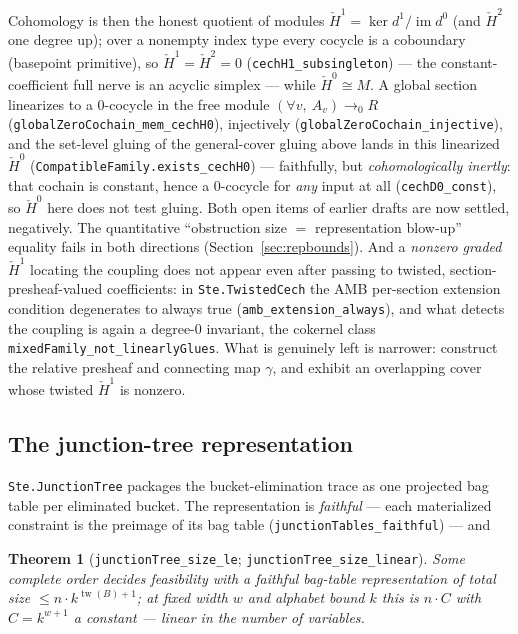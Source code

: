 \documentclass[11pt]{article}
\newtheorem{theorem}{Theorem}
\newcommand{\lean}[1]{\texttt{#1}}
\begin{document}
\noindent Cohomology is then the honest quotient of modules
$\check{H}^1 = \ker d^1 / \operatorname{im} d^0$ (and $\check{H}^2$ one
degree up); over a nonempty index type every cocycle is a coboundary
(basepoint primitive), so $\check{H}^1 = \check{H}^2 = 0$
(\lean{cechH1\_subsingleton}) --- the constant-coefficient full nerve is
an acyclic simplex --- while $\check{H}^0 \cong M$.  A global section
linearizes to a $0$-cocycle in the free module $(\forall v,\ A_v) \to_0
R$ (\lean{globalZeroCochain\_mem\_cechH0}), injectively
(\lean{globalZeroCochain\_injective}), and the set-level gluing of
the general-cover gluing above lands in this linearized $\check{H}^0$
(\lean{CompatibleFamily.exists\_cechH0}) --- faithfully, but
\emph{cohomologically inertly}: that cochain is constant, hence a
$0$-cocycle for \emph{any} input at all (\lean{cechD0\_const}), so
$\check{H}^0$ here does not test gluing.  Both open items of earlier
drafts are now settled, negatively.  The quantitative ``obstruction size
$=$ representation blow-up'' equality fails in both directions
(Section~\ref{sec:repbounds}).  And a \emph{nonzero graded}
$\check{H}^1$ locating the coupling does not appear even after passing
to twisted, section-presheaf-valued coefficients: in
\lean{Ste.TwistedCech} the AMB per-section extension condition
degenerates to always true (\lean{amb\_extension\_always}), and what
detects the coupling is again a degree-$0$ invariant, the cokernel class
\lean{mixedFamily\_not\_linearlyGlues}.  What is genuinely left is
narrower: construct the relative presheaf and connecting map $\gamma$,
and exhibit an overlapping cover whose twisted $\check{H}^1$ is
nonzero.

\subsection{The junction-tree representation}
\lean{Ste.JunctionTree} packages the bucket-elimination trace as one
projected bag table per eliminated bucket.  The representation is
\emph{faithful} --- each materialized constraint is the preimage of its
bag table (\lean{junctionTables\_faithful}) --- and

\begin{theorem}[\lean{junctionTree\_size\_le};
\lean{junctionTree\_size\_linear}]
Some complete order decides feasibility with a faithful bag-table
representation of total size $\le n \cdot k^{\operatorname{tw}(B)+1}$;
at fixed width $w$ and alphabet bound $k$ this is $n \cdot C$ with
$C = k^{w+1}$ a constant --- linear in the number of variables.
\end{theorem}
\end{document}
